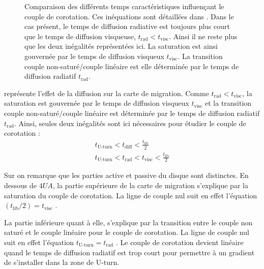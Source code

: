 \begin{figure}[htbp]
\centering
{}\hfill
{}

\caption{Comparaison des différents temps caractéristiques influençant le couple de corotation. Ces inéquations sont détaillées
dans . Dans le cas présent, le temps de diffusion radiative est toujours plus court que le temps
de diffusion visqueuse, $t_\text{rad}<t_\text{visc}$. Ainsi il ne reste plus que les deux inégalités représentées
ici. La saturation est ainsi gouvernée par le temps de diffusion visqueux $t_\text{visc}$. La transition couple non-saturé/couple linéaire est elle déterminée par le temps de diffusion radiatif $t_\text{rad}$.}\label{fig:timescales_maps}
\end{figure}

 représente l'effet de la diffusion sur la carte de migration. Comme $t_\text{rad}<t_\text{visc}$, la saturation est gouvernée par le temps de diffusion visqueux $t_\text{visc}$ et la transition couple non-saturé/couple linéaire est déterminée par le temps de diffusion radiatif $t_\text{rad}$. Ainsi, seules deux inégalités sont ici nécessaires pour étudier le couple de corotation :
\begin{align}
t_\text{U-turn} < t_\text{diff} < \frac{t_\text{lib}}{2}\\\nonumber
t_\text{U-turn} < t_\text{rad} < t_\text{visc} < \frac{t_\text{lib}}{2}
\end{align}

Sur  on remarque que les parties active et passive du disque sont distinctes. En dessous de $4\unit{UA}$, la partie supérieure de la carte de migration s'explique par la saturation du couple de corotation. La ligne de couple nul suit en effet l'équation $(t_\text{lib}/2) = t_\text{visc}$ .

La partie inférieure quant à elle, s'explique par la transition entre le couple non saturé et le couple linéaire pour le couple de corotation. La ligne de couple nul suit en effet l'équation $t_\text{U-turn} = t_\text{rad}$ . Le couple de corotation devient linéaire quand le temps de diffusion radiatif est trop court pour permettre à un gradient de s'installer dans la zone de \og U-turn\fg.

